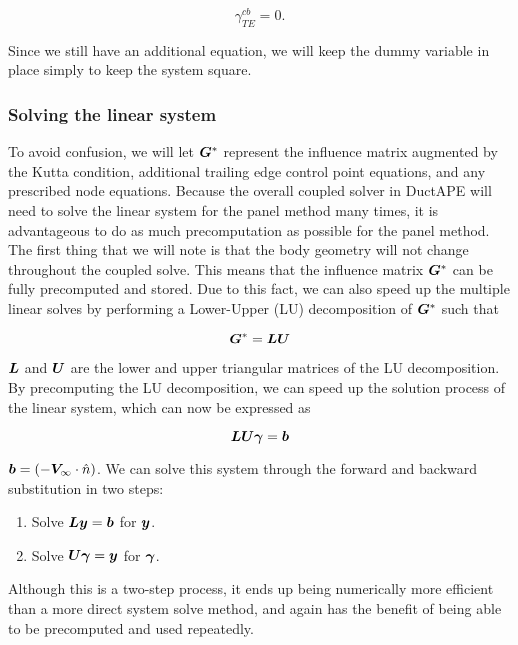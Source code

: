 \begin{equation}
    \gamma_{TE}^{cb} = 0.
\end{equation}

\noindent Since we still have an additional equation, we will keep the dummy variable in place simply to keep the system square.


\subsubsection{Solving the linear system}

To avoid confusion, we will let \(\bm{G}^*\) represent the influence matrix augmented by the Kutta condition, additional trailing edge control point equations, and any prescribed node equations.
%
Because the overall coupled solver in DuctAPE will need to solve the linear system for the panel method many times, it is advantageous to do as much precomputation as possible for the panel method.
%
The first thing that we will note is that the body geometry will not change throughout the coupled solve.
%
This means that the influence matrix \(\bm{G}^*\) can be fully precomputed and stored.
%
Due to this fact, we can also speed up the multiple linear solves by performing a Lower-Upper (LU) decomposition of \(\bm{G}^*\) such that

\begin{equation}
    \bm{G}^* = \bm{LU}
\end{equation}

\where \(\bm{L}\) and \(\bm{U}\) are the lower and upper triangular matrices of the LU decomposition.
%
By precomputing the LU decomposition, we can speed up the solution process of the linear system, which can now be expressed as

\begin{equation}
    \bm{LU}\bm{\gamma} = \bm{b}
\end{equation}

\where \(\bm{b}=\left(-\bm{V}_\infty \cdot \hat{n}\right)\).
%
We can solve this system through the forward and backward substitution in two steps:
\begin{enumerate}
    \item Solve \(\bm{L}\bm{y} = \bm{b}\) for \(\bm{y}\).
    \item Solve \(\bm{U}\bm{\gamma} = \bm{y}\) for \(\bm{\gamma}\).
\end{enumerate}
%
Although this is a two-step process, it ends up being numerically more efficient than a more direct system solve method, and again has the benefit of being able to be precomputed and used repeatedly.



